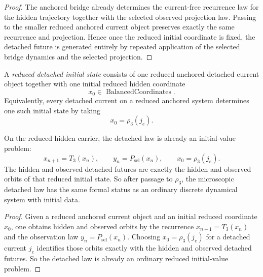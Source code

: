 \begin{proof}
The anchored bridge already determines the current-free recurrence law for the
hidden trajectory together with the selected observed projection law. Passing to
the smaller reduced anchored current object preserves exactly the same
recurrence and projection. Hence once the reduced initial coordinate is fixed,
the detached future is generated entirely by repeated application of the
selected bridge dynamics and the selected projection.
\end{proof}

\begin{definition}
\label{def:reduced-detached-initial-state}
A \emph{reduced detached initial state} consists of one reduced anchored
detached current object together with one initial reduced hidden coordinate
\[
x_0 \in \operatorname{BalancedCoordinates}.
\]
Equivalently, every detached current on a reduced anchored system determines
one such initial state by taking
\[
x_0=\rho_3(j_e).
\]
\end{definition}

\begin{corollary}
\label{thm:the-detached-law-is-a-reduced-initial-value-problem}
On the reduced hidden carrier, the detached law is already an initial-value
problem:
\[
x_{n+1}=T_3(x_n),
\qquad
y_n=P_{\mathrm{sel}}(x_n),
\qquad
x_0=\rho_3(j_e).
\]
The hidden and observed detached futures are exactly the hidden and observed
orbits of that reduced initial state. So after passage to \(\rho_3\), the
microscopic detached law has the same formal status as an ordinary discrete
dynamical system with initial data.
\end{corollary}

\begin{proof}
Given a reduced anchored current object and an initial reduced coordinate
\(x_0\), one obtains hidden and observed orbits by the recurrence
\(x_{n+1}=T_3(x_n)\) and the observation law \(y_n=P_{\mathrm{sel}}(x_n)\). Choosing
\(x_0=\rho_3(j_e)\) for a detached current \(j_e\) identifies those orbits
exactly with the hidden and observed detached futures. So the detached law is
already an ordinary reduced initial-value problem.
\end{proof}

